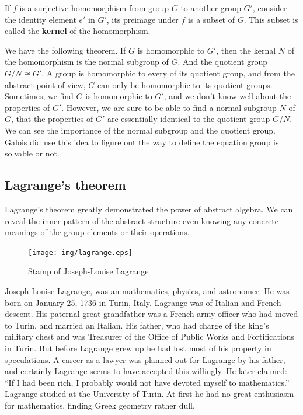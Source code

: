 \documentclass{article}
\begin{document}
\begin{definition}
If $f$ is a surjective homomorphism from group $G$ to another group $G'$, consider the identity element $e'$ in $G'$, its preimage under $f$ is a subset of $G$. This subset is called the \textbf{kernel} of the homomorphism.
\end{definition}

We have the following theorem. If $G$ is homomorphic to $G'$, then the kernal $N$ of the homomorphism is the normal subgroup of $G$. And the quotient group $G/N \cong G'$. A group is homomorphic to every of its quotient group, and from the abstract point of view, $G$ can only be homomorphic to its quotient groups. Sometimes, we find $G$ is homomorphic to $G'$, and we don't know well about the properties of $G'$. However, we are sure to be able to find a normal subgroup $N$ of $G$, that the properties of $G'$ are essentially identical to the quotient group $G/N$. We can see the importance of the normal subgroup and the quotient group. Galois did use this idea to figure out the way to define the equation group is solvable or not.

\begin{Exercise}
\end{Exercise}

\subsection{Lagrange's theorem}

Lagrange's theorem greatly demonstrated the power of abstract algebra. We can reveal the inner pattern of the abstract structure even knowing any concrete meanings of the group elements or their operations.

\begin{figure}
 \centering
 \texttt{[image: img/lagrange.eps]}
 \captionsetup{labelformat=empty}
 \caption{Stamp of Joseph-Louise Lagrange}
 \label{fig:Lagrange}
\end{figure}

Joseph-Louise Lagrange, was an mathematics, physics, and astronomer. He was born on January 25, 1736 in Turin, Italy. Lagrange was of Italian and French descent. His paternal great-grandfather was a French army officer who had moved to Turin, and married an Italian. His father, who had charge of the king's military chest and was Treasurer of the Office of Public Works and Fortifications in Turin. But before Lagrange grew up he had lost most of his property in speculations. A career as a lawyer was planned out for Lagrange by his father, and certainly Lagrange seems to have accepted this willingly. He later claimed: ``If I had been rich, I probably would not have devoted myself to mathematics.'' Lagrange studied at the University of Turin. At first he had no great enthusiasm for mathematics, finding Greek geometry rather dull.
\end{document}
